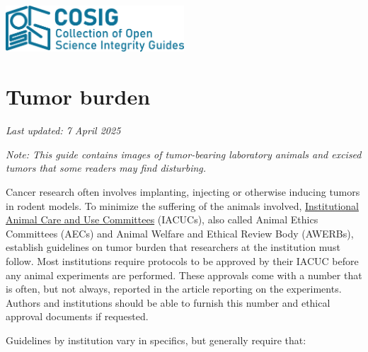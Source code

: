 \documentclass[letterpaper, 12pt]{article}
\begin{document}
\flushleft
\includegraphics[width=0.5\textwidth]{img/home/241017_final_logo_mockup.png}

\section*{Tumor burden}
\textit{Last updated: 7 April 2025}

\textit{Note: This guide contains images of tumor-bearing laboratory animals and excised tumors that some readers may find disturbing.}

Cancer research often involves implanting, injecting or otherwise inducing tumors in rodent models. To minimize the suffering of the animals involved, \href{https://en.wikipedia.org/wiki/Institutional_Animal_Care_and_Use_Committee}{Institutional Animal Care and Use Committees} (IACUCs), also called Animal Ethics Committees (AECs) and Animal Welfare and Ethical Review Body (AWERBs), establish guidelines on tumor burden that researchers at the institution must follow. Most institutions require protocols to be approved by their IACUC before any animal experiments are performed. These approvals come with a number that is often, but not always, reported in the article reporting on the experiments. Authors and institutions should be able to furnish this number and ethical approval documents if requested.

Guidelines by institution vary in specifics, but generally require that:
\end{document}
